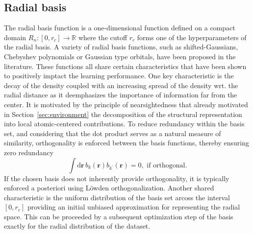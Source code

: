 \subsection{Radial basis}
\label{sec:radial_basis_set}
The radial basis function is a one-dimensional function defined on a compact domain $R_n:[0, r_c]\rightarrow\mathbb{R}$ where the cutoff $r_c$ forms one of the hyperparameters of the radial basis.
A variety of radial basis functions, such as shifted-Gaussians\cite{bartok2013representing}, Chebyshev polynomials\cite{shapeev2016moment,drautz2019atomic} or Gaussian type orbitals\cite{musil2021efficient}, have been proposed in the literature.
These functions all share certain characteristics that have been shown to positively imptact the learning performance. 
One key characteristic is the decay of the density   
 coupled with an increasing spread of the density wrt. the radial distance as it deemphasizes the importance of information far from the center.
 It is motivated by the principle of nearsightedness\cite{prodan2005nearsightedness} that already motivated in Section~\ref{sec:environment} the decomposition of the structural representation into local atomic-centered contributions.
To reduce redundancy within the basis set, and considering that the dot product serves as a natural measure of similarity, orthogonality is enforced between the basis functions, thereby ensuring zero redundancy
\begin{equation}
  \int\mathrm{d}\mathbf{r}\,b_k(\mathbf{r})b_{k^\prime}(\mathbf{r}) = 0,\textrm{ if orthogonal}.
\end{equation}
If the chosen basis does not inherently provide orthogonality, it is typically enforced a posteriori %
using Löwden orthogonalization\cite{PIELA2014e99}.
Another shared characteristic is the uniform distribution of the basis set arcoss the interval $[0, r_c]$ providing an initial unbiased approximation for representing the radial space\cite{schutt2018schnet,dusson2022atomic}.
This can be proceeded by a subsequent optimization step of the basis exactly for the radial distribution of the dataset.
